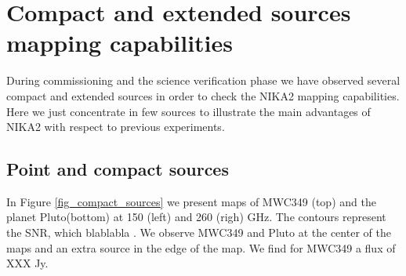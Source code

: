 \documentclass[]{aa} %
\begin{document}
\section{Compact and extended sources mapping capabilities}
During commissioning and the science verification phase we have observed several compact and extended sources 
in order to check the NIKA2 mapping capabilities. Here we just concentrate in few sources to illustrate the main advantages of NIKA2 with respect to previous experiments.

\subsection{Point and compact sources} 
In Figure \ref{fig_compact_sources} we present maps of MWC349 (top) and the planet Pluto(bottom) at 150 (left) and 260 (righ) GHz.
The contours represent the SNR, which  blablabla .
We observe MWC349 and Pluto at the center of the maps and an extra source in the edge of the map. We find for MWC349 a flux of XXX Jy.
\end{document}
